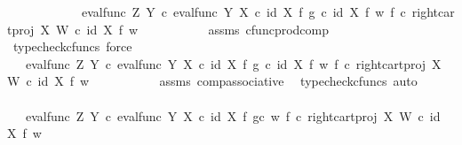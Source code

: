 \begin{isabellebody}
\ \ \ \ \ \ \ \ \ \ {\isacharequal}{\kern0pt}\ \ eval{\isacharunderscore}{\kern0pt}func\ Z\ Y\ {\isasymcirc}\isactrlsub c\ {\isasymlangle}{\isacharparenleft}{\kern0pt}eval{\isacharunderscore}{\kern0pt}func\ Y\ X\ {\isasymcirc}\isactrlsub c\ {\isacharparenleft}{\kern0pt}id\ X\ {\isasymtimes}\isactrlsub f\ g{\isacharparenright}{\kern0pt}{\isacharparenright}{\kern0pt}\ {\isasymcirc}\isactrlsub c\ {\isacharparenleft}{\kern0pt}id\ X\ {\isasymtimes}\isactrlsub f\ w{\isacharparenright}{\kern0pt}{\isacharcomma}{\kern0pt}\ {\isacharparenleft}{\kern0pt}f\ {\isasymcirc}\isactrlsub c\ right{\isacharunderscore}{\kern0pt}cart{\isacharunderscore}{\kern0pt}proj\ X\ W{\isacharparenright}{\kern0pt}\ {\isasymcirc}\isactrlsub c\ {\isacharparenleft}{\kern0pt}id\ X\ {\isasymtimes}\isactrlsub f\ w{\isacharparenright}{\kern0pt}{\isasymrangle}{\isachardoublequoteclose}\isanewline
\ \ \ \ \ \ \ \ \ \isamarkupfalse%
\ assms\ cfunc{\isacharunderscore}{\kern0pt}prod{\isacharunderscore}{\kern0pt}comp\ \isamarkupfalse%
\ {\isacharparenleft}{\kern0pt}typecheck{\isacharunderscore}{\kern0pt}cfuncs{\isacharcomma}{\kern0pt}\ force{\isacharparenright}{\kern0pt}\isanewline
\ \ \ \ \ \ \ \isamarkupfalse%
\ \isamarkupfalse%
\ {\isachardoublequoteopen}{\isachardot}{\kern0pt}{\isachardot}{\kern0pt}{\isachardot}{\kern0pt}\ {\isacharequal}{\kern0pt}\ eval{\isacharunderscore}{\kern0pt}func\ Z\ Y\ {\isasymcirc}\isactrlsub c\ {\isasymlangle}eval{\isacharunderscore}{\kern0pt}func\ Y\ X\ {\isasymcirc}\isactrlsub c\ {\isacharparenleft}{\kern0pt}id\ X\ {\isasymtimes}\isactrlsub f\ g{\isacharparenright}{\kern0pt}\ {\isasymcirc}\isactrlsub c\ {\isacharparenleft}{\kern0pt}id\ X\ {\isasymtimes}\isactrlsub f\ w{\isacharparenright}{\kern0pt}{\isacharcomma}{\kern0pt}\ f\ {\isasymcirc}\isactrlsub c\ right{\isacharunderscore}{\kern0pt}cart{\isacharunderscore}{\kern0pt}proj\ X\ W\ {\isasymcirc}\isactrlsub c\ {\isacharparenleft}{\kern0pt}id\ X\ {\isasymtimes}\isactrlsub f\ w{\isacharparenright}{\kern0pt}{\isasymrangle}{\isachardoublequoteclose}\isanewline
\ \ \ \ \ \ \ \ \ \isamarkupfalse%
\ assms\ comp{\isacharunderscore}{\kern0pt}associative{}\ \isamarkupfalse%
\ {\isacharparenleft}{\kern0pt}typecheck{\isacharunderscore}{\kern0pt}cfuncs{\isacharcomma}{\kern0pt}\ auto{\isacharparenright}{\kern0pt}\isanewline
\ \ \ \ \ \ \ \isamarkupfalse%
\ \isamarkupfalse%
\ {\isachardoublequoteopen}{\isachardot}{\kern0pt}{\isachardot}{\kern0pt}{\isachardot}{\kern0pt}\ {\isacharequal}{\kern0pt}\ eval{\isacharunderscore}{\kern0pt}func\ Z\ Y\ {\isasymcirc}\isactrlsub c\ {\isasymlangle}eval{\isacharunderscore}{\kern0pt}func\ Y\ X\ {\isasymcirc}\isactrlsub c\ {\isacharparenleft}{\kern0pt}id\ X\ {\isasymtimes}\isactrlsub f\ {\isacharparenleft}{\kern0pt}g{\isasymcirc}\isactrlsub c\ w{\isacharparenright}{\kern0pt}{\isacharparenright}{\kern0pt}{\isacharcomma}{\kern0pt}\ f\ {\isasymcirc}\isactrlsub c\ right{\isacharunderscore}{\kern0pt}cart{\isacharunderscore}{\kern0pt}proj\ X\ W\ {\isasymcirc}\isactrlsub c\ {\isacharparenleft}{\kern0pt}id\ X\ {\isasymtimes}\isactrlsub f\ w{\isacharparenright}{\kern0pt}{\isasymrangle}{\isachardoublequoteclose}\isanewline

\end{isabellebody}
